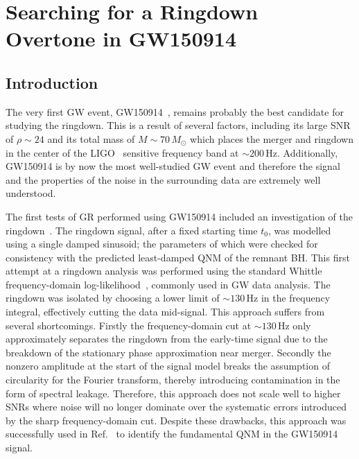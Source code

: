 

\chapter{Searching for a Ringdown Overtone in GW150914}

\label{Chapter4}

\section{Introduction}\label{ch4:sec:introduction}

The very first GW event, GW150914~\cite{LIGOScientific:2016aoc}, remains probably the best candidate for studying the ringdown.
This is a result of several factors, including its large SNR of $\rho\sim 24$ and its total mass of $M\sim 70\,M_\odot$ which places the merger and ringdown in the center of the LIGO~\cite{LIGOScientific:2014pky} sensitive frequency band at $\sim 200\,\mathrm{Hz}$. 
Additionally, GW150914 is by now the most well-studied GW event and therefore the signal and the properties of the noise in the surrounding data are extremely well understood.

The first tests of GR performed using GW150914 included an investigation of the ringdown~\cite{LIGOScientific:2016lio}. 
The ringdown signal, after a fixed starting time $t_0$, was modelled using a single damped sinusoid; the parameters of which were checked for consistency with the predicted least-damped QNM of the remnant BH.
This first attempt at a ringdown analysis was performed using the standard Whittle frequency-domain log-likelihood~\cite{10.2307/2983994}, commonly used in GW data analysis.
The ringdown was isolated by choosing a lower limit of $\sim 130\, \mathrm{Hz}$ in the frequency integral, effectively cutting the data mid-signal.
This approach suffers from several shortcomings. 
Firstly the frequency-domain cut at $\sim 130\, \mathrm{Hz}$ only approximately separates the ringdown from the early-time signal due to the breakdown of the stationary phase approximation near merger. 
Secondly the nonzero amplitude at the start of the signal model breaks the assumption of circularity for the Fourier transform, thereby introducing contamination in the form of spectral leakage. 
Therefore, this approach does not scale well to higher SNRs where noise will no longer dominate over the systematic errors introduced by the sharp frequency-domain cut.
Despite these drawbacks, this approach was successfully used in Ref.~\cite{LIGOScientific:2016lio} to identify the fundamental QNM in the GW150914 signal.

